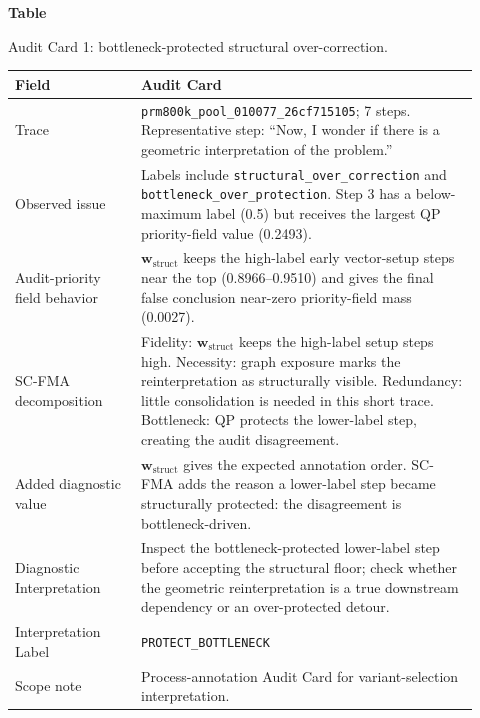 \documentclass[a4paper,fleqn]{cas-sc}
\newcommand{\wstruct}{\ensuremath{\mathbf{w}_{\mathrm{struct}}}}
\begin{document}
\par\medskip
{}\label{tab:audit-card-geometric}
\noindent\textbf{Table~\thetable}\par
\noindent Audit Card 1: bottleneck-protected structural over-correction.
\begin{center}
\small
\renewcommand{\arraystretch}{1.08}
\begin{tabular}{p{0.25\linewidth}p{0.67\linewidth}}
\toprule
\textbf{Field} & \textbf{Audit Card} \\
\midrule
Trace & \texttt{prm800k\_pool\_010077\_26cf715105}; 7 steps. Representative step: ``Now, I wonder if there is a geometric interpretation of the problem.'' \\
Observed issue & Labels include \texttt{structural\_over\_correction} and \texttt{bottleneck\_over\_protection}. Step 3 has a below-maximum label (0.5) but receives the largest QP priority-field value (0.2493). \\
Audit-priority field behavior & \wstruct{} keeps the high-label early vector-setup steps near the top (0.8966--0.9510) and gives the final false conclusion near-zero priority-field mass (0.0027). \\
SC-FMA decomposition & Fidelity: \wstruct{} keeps the high-label setup steps high. Necessity: graph exposure marks the reinterpretation as structurally visible. Redundancy: little consolidation is needed in this short trace. Bottleneck: QP protects the lower-label step, creating the audit disagreement. \\
Added diagnostic value & \wstruct{} gives the expected annotation order. SC-FMA adds the reason a lower-label step became structurally protected: the disagreement is bottleneck-driven. \\
Diagnostic Interpretation & Inspect the bottleneck-protected lower-label step before accepting the structural floor; check whether the geometric reinterpretation is a true downstream dependency or an over-protected detour. \\
Interpretation Label & \texttt{PROTECT\_BOTTLENECK} \\
Scope note & Process-annotation Audit Card for variant-selection interpretation. \\
\bottomrule
\end{tabular}
\end{center}
\medskip
\end{document}
